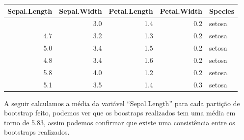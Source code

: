 \documentclass[
  a4paperpaper,
]{article}
\newenvironment{Shaded}{\begin{snugshade}}{\end{snugshade}}
\newcommand{\AttributeTok}[1]{\textcolor[rgb]{0.40,0.45,0.13}{#1}}
\newcommand{\CommentTok}[1]{\textcolor[rgb]{0.37,0.37,0.37}{#1}}
\newcommand{\DecValTok}[1]{\textcolor[rgb]{0.68,0.00,0.00}{#1}}
\newcommand{\FunctionTok}[1]{\textcolor[rgb]{0.28,0.35,0.67}{#1}}
\newcommand{\NormalTok}[1]{\textcolor[rgb]{0.00,0.23,0.31}{#1}}
\newcommand{\OtherTok}[1]{\textcolor[rgb]{0.00,0.23,0.31}{#1}}
\newcommand{\SpecialCharTok}[1]{\textcolor[rgb]{0.37,0.37,0.37}{#1}}
\begin{document}
\begin{Shaded}
\end{Shaded}

\begin{longtable}[]{@{}rrrrl@{}}
\toprule\noalign{}
Sepal.Length & Sepal.Width & Petal.Length & Petal.Width & Species \\
\midrule\noalign{}
\endhead
\bottomrule\noalign{}
\endlastfoot
4.9 & 3.0 & 1.4 & 0.2 & setosa \\
4.7 & 3.2 & 1.3 & 0.2 & setosa \\
5.0 & 3.4 & 1.5 & 0.2 & setosa \\
4.8 & 3.4 & 1.6 & 0.2 & setosa \\
5.8 & 4.0 & 1.2 & 0.2 & setosa \\
5.1 & 3.5 & 1.4 & 0.3 & setosa \\
\end{longtable}

A seguir calculamos a média da variável ``Sepal.Length'' para cada
partição de bootstrap feito, podemos ver que os boostraps realizados tem
uma média em torno de 5.83, assim podemos confirmar que existe uma
consistência entre os bootstraps realizados.

\begin{Shaded}
\end{Shaded}
\end{document}
